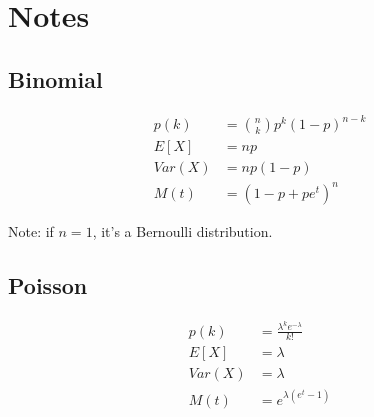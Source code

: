 \section{Notes}

\begin{minipage}{.09\textwidth}
  \subsection{Binomial}

    \begin{align*}
    	p(k)&={{n}\choose{k} }p^k (1-p)^{n-k} \\
    	E[X]&=np \\
    	Var(X)&=np(1-p) \\
    	M(t)&=(1-p+pe^{t})^{n}
    \end{align*}

Note: if $n=1$, it's a Bernoulli distribution.
\end{minipage}%
\begin{minipage}{.09\textwidth}
  \subsection{Poisson}

    \begin{align*}
    	p(k)&=\frac{\lambda^ke^{-\lambda}}{k!} \\
    	E[X]&=\lambda \\
    	Var(X)&=\lambda \\
    	M(t)&=e^{\lambda(e^t-1)}
    \end{align*}
\end{minipage}

